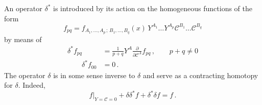 \documentclass[a4paper,11pt]{amsart}
\numberwithin{thm}{section} %
\numberwithin{equation}{section} %
\numberwithin{figure}{section} %
\renewcommand{\:}{{\rm\, :\,}}
\def\d{\partial}
\newcommand{\dl}[1]{\displaystyle\frac{{\d}}{\d #1}}
\def\cc{{\mathcal C}}
\begin{document}
An operator $\delta^*$ is introduced by its action on the
homogeneous functions of the form
\begin{equation}
  f_{pq}=f_{A_1,\ldots,A_p\,;\,B_1,\ldots,B_q}(x)\,Y^{A_1}\ldots Y^{A_p}
\cc^{B_1}\ldots \cc^{B_q}
\end{equation}
by means of
\begin{equation}
\begin{split}
  \delta^* f_{pq}&=\frac{1}{p+q}Y^A \dl{\cc^A}f_{pq}\,,  \qquad p+q \neq 0 \\
 \qquad \delta^* f_{00}&=0\,.
\end{split}
\end{equation}
The operator $\delta$ is in some sense inverse to $\delta$
and serve as a contracting homotopy for $\delta$. Indeed,
\begin{equation}
f|_{Y=\cc=0}+\delta\delta^* f + \delta^*\delta  f = f\,.
\end{equation}
\end{document}
